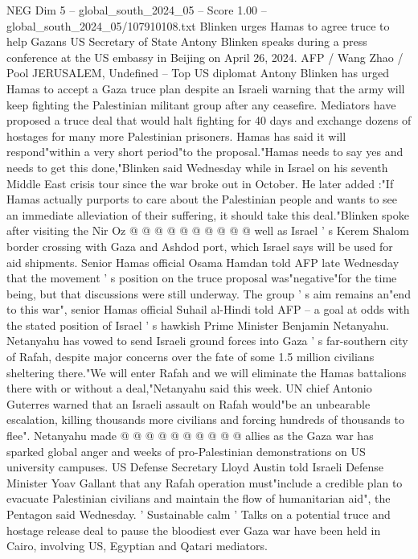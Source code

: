 \begin{textsample}{NEG Dim 5 – global\_south\_2024\_05 – Score 1.00 – global\_south\_2024\_05/107910108.txt}  \label{ex:f5_neg_389}
Blinken urges Hamas to agree truce to help Gazans US Secretary of State Antony Blinken speaks during a press conference at the US embassy in Beijing on April 26, 2024.
AFP / Wang Zhao / Pool JERUSALEM, Undefined -- Top US diplomat Antony Blinken has urged Hamas to accept a Gaza truce plan despite an Israeli warning that the army will keep fighting the Palestinian militant group after any ceasefire.
Mediators have proposed a truce deal that would halt fighting for 40 days and exchange dozens of hostages for many more Palestinian prisoners.
Hamas has said it will respond"within a very short period"to the proposal."Hamas needs to say yes and needs to get this done,"Blinken said Wednesday while in Israel on his seventh Middle East crisis tour since the war broke out in October.
He later added :"If Hamas actually purports to care about the Palestinian people and wants to see an immediate alleviation of their suffering, it should take this deal."Blinken spoke after visiting the Nir Oz @ @ @ @ @ @ @ @ @ @ well as Israel ' s Kerem Shalom border crossing with Gaza and Ashdod port, which Israel says will be used for aid shipments.
Senior Hamas official Osama Hamdan told AFP late Wednesday that the movement ' s position on the truce proposal was"negative"for the time being, but that discussions were still underway.
The group ' s aim remains an"end to this war", senior Hamas official Suhail al-Hindi told AFP -- a goal at odds with the stated position of Israel ' s hawkish Prime Minister Benjamin Netanyahu.
Netanyahu has vowed to send Israeli ground forces into Gaza ' s far-southern city of Rafah, despite major concerns over the fate of some 1.5 million civilians sheltering there."We will enter Rafah and we will eliminate the Hamas battalions there with or without a deal,"Netanyahu said this week.
UN chief Antonio Guterres warned that an Israeli assault on Rafah would"be an unbearable escalation, killing thousands more civilians and forcing hundreds of thousands to flee".
Netanyahu made @ @ @ @ @ @ @ @ @ @ allies as the Gaza war has sparked global anger and weeks of pro-Palestinian demonstrations on US university campuses.
US Defense Secretary Lloyd Austin told Israeli Defense Minister Yoav Gallant that any Rafah operation must"include a credible plan to evacuate Palestinian civilians and maintain the flow of humanitarian aid", the Pentagon said Wednesday. ' Sustainable calm ' Talks on a potential truce and hostage release deal to pause the bloodiest ever Gaza war have been held in Cairo, involving US, Egyptian and Qatari mediators.

\end{textsample}
